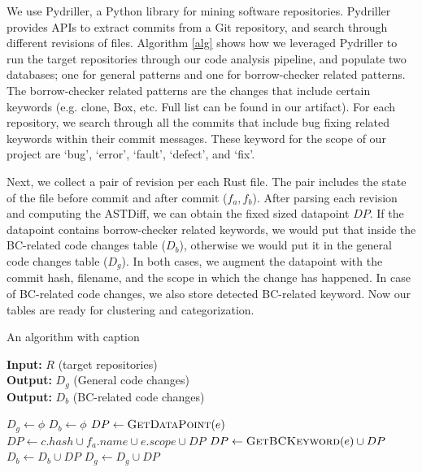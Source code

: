 We use Pydriller, a Python library for mining software repositories. Pydriller provides APIs to extract commits from a Git repository, and search through different revisions of files. Algorithm \ref{alg} shows how we leveraged Pydriller to run the target repositories through our code analysis pipeline, and populate two databases; one for general patterns and one for borrow-checker related patterns. The borrow-checker related patterns are the changes that include certain keywords (e.g. clone, Box, etc. Full list can be found in our artifact). For each repository, we search through all the commits that include bug fixing related keywords within their commit messages. These keyword for the scope of our project are `bug', `error', `fault', `defect', and `fix'. 

Next, we collect a pair of revision per each Rust file. The pair includes the state of the file before commit and after commit ($f_a, f_b$). After parsing each revision and computing the ASTDiff, we can obtain the fixed sized datapoint $DP$. If the datapoint contains borrow-checker related keywords, we would put that inside the BC-related code changes table ($D_b$), otherwise we would put it in the general code changes table ($D_g$). In both cases, we augment the datapoint with the commit hash, filename, and the scope in which the change has happened. In case of BC-related code changes, we also store detected BC-related keyword. Now our tables are ready for clustering and categorization.

\begin{algorithm}
\caption{An algorithm with caption}\label{alg}
\hspace*{2mm} \textbf{Input:} $R$ (target repositories)  \\
\hspace*{2mm} \textbf{Output:} $D_g$ (General code changes) \\
\hspace*{2mm} \textbf{Output:} $D_b$ (BC-related code changes)
\begin{algorithmic}
\State $D_g \leftarrow \phi$
\State $D_b \leftarrow \phi$
                    \State $DP \leftarrow \textsc{GetDataPoint}(e)$
                    \State $DP \leftarrow c.hash \cup f_a.name \cup e.scope \cup DP $
                        \State $DP \leftarrow \textsc{GetBCKeyword}(e) \cup DP $
                        \State $D_b \leftarrow D_b \cup DP$
                    \Else
                        \State $D_g \leftarrow D_g \cup DP$
                    \EndIf
                \EndFor
            \EndFor
        \EndIf
    \EndFor
\EndFor
\end{algorithmic}
\end{algorithm}


